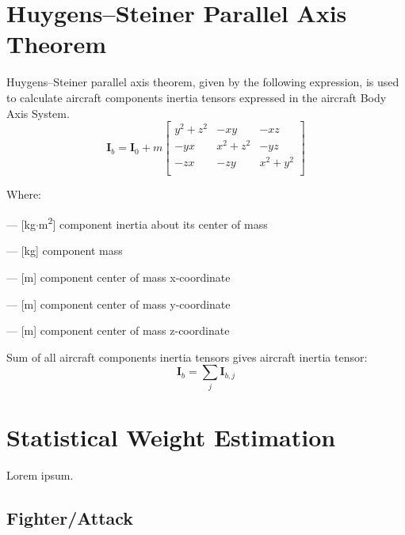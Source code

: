 \section{Huygens–Steiner Parallel Axis Theorem}

Huygens–Steiner parallel axis theorem, given by the following expression, is used to calculate aircraft components inertia tensors expressed in the aircraft Body Axis System. \cite{Awrejcewicz2012}
\begin{equation}
  \label{eq-mass-steiners}
  {\boldsymbol I}_b
  =
  {\boldsymbol I}_0
  +
  m
  \left[
    \begin{matrix}
      y^2 + z^2 &       -xy &       -xz \\
            -yx & x^2 + z^2 &       -yz \\
            -zx &       -zy & x^2 + y^2 \\
    \end{matrix}
  \right]
\end{equation}

Where:
\begin{description}[align=right,labelwidth=1cm]
  \item [${\boldsymbol I}_0$] --- [kg$\cdot$m\textsuperscript{2}] component inertia about its center of mass
  \item [$m$] --- [kg] component mass
  \item [$x$] --- [m] component center of mass x-coordinate
  \item [$y$] --- [m] component center of mass y-coordinate
  \item [$z$] --- [m] component center of mass z-coordinate
\end{description}

Sum of all aircraft components inertia tensors gives aircraft inertia tensor:
\begin{equation}
  {\boldsymbol I}_{b} = \sum_{j} {\boldsymbol I}_{b,j}
\end{equation}

\section{Statistical Weight Estimation}

Lorem ipsum. \cite{NASA-TP-2015-218751,Raymer2018}

\subsection{Fighter/Attack}

